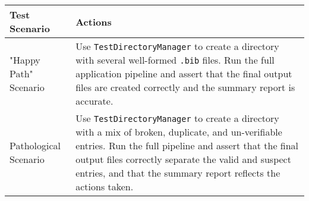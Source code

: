 \documentclass[11pt, a4paper]{article}
\begin{document}
\begin{table}[h!]
\centering
\begin{tabular}{lp{}}
\toprule
\textbf{Test Scenario} & \textbf{Actions} \\
\midrule
"Happy Path" Scenario &
Use \texttt{TestDirectoryManager} to create a directory with several well-formed \texttt{.bib} files. Run the full application pipeline and assert that the final output files are created correctly and the summary report is accurate. \\
\addlinespace
Pathological Scenario &
Use \texttt{TestDirectoryManager} to create a directory with a mix of broken, duplicate, and un-verifiable entries. Run the full pipeline and assert that the final output files correctly separate the valid and suspect entries, and that the summary report reflects the actions taken. \\
\bottomrule
\end{tabular}
\end{table}
\end{document}
